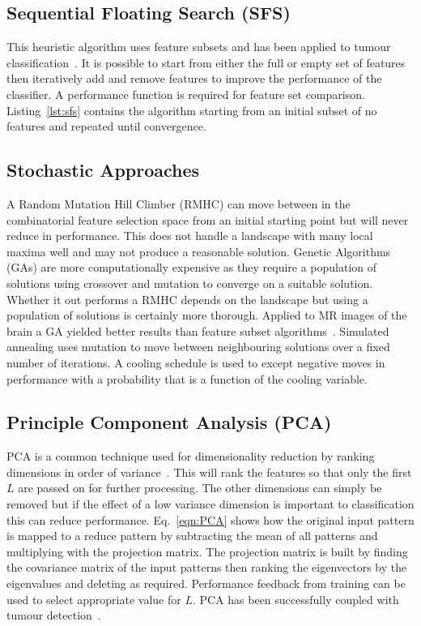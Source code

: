 \documentclass[journal]{IEEEtran}
\begin{document}
\subsection{Sequential Floating Search (SFS)}

This heuristic algorithm uses feature subsets and has been applied to tumour classification~\cite{hau07feat}.
It is possible to start from either the full or empty set of features then iteratively add and remove features to improve the performance of the classifier. 
A performance function is required for feature set comparison. 
Listing~\ref{lst:sfs} contains the algorithm starting from an initial subset of no features and repeated until convergence.




\subsection{Stochastic Approaches}
A Random Mutation Hill Climber (RMHC) can move between in the combinatorial feature selection space from an initial starting point but will never reduce in performance.  
This does not handle a landscape with many local maxima well and may not produce a reasonable solution.
Genetic Algorithms (GAs) are more computationally expensive as they require a population of solutions using crossover and mutation to converge on a suitable solution.   
Whether it out performs a RMHC depends on the landscape but using a population of solutions is certainly more thorough.   
Applied to MR images of the brain a GA yielded better results than feature subset algorithms~\cite{sasikala05ga}.
Simulated annealing uses mutation to move between neighbouring solutions over a fixed number of iterations.
A cooling schedule is used to except negative moves in performance with a probability that is a function of the cooling variable. 


\subsection{Principle Component Analysis (PCA)}
PCA is a common technique used for dimensionality reduction by ranking dimensions in order of variance~\cite{barberBRML2012}.
This will rank the features so that only the first $L$ are passed on for further processing. 
The other dimensions can simply be removed but if the effect of a low variance dimension is important to classification this can reduce performance.
Eq.~\eqref{eqn:PCA} shows how the original input pattern is mapped to a reduce pattern by subtracting the mean of all patterns and multiplying with the projection matrix.
The projection matrix is built by finding the covariance matrix of the input patterns then ranking the eigenvectors by the eigenvalues and deleting as required.
Performance feedback from training can be used to select appropriate value for $L$.
PCA has been successfully coupled with tumour detection~\cite{ahmed2011efficacy}.
\end{document}
